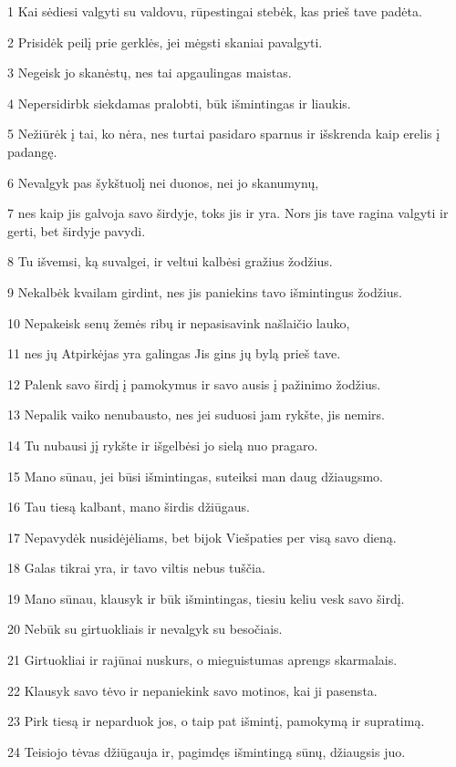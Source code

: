 \par 1 Kai sėdiesi valgyti su valdovu, rūpestingai stebėk, kas prieš tave padėta. 
\par 2 Prisidėk peilį prie gerklės, jei mėgsti skaniai pavalgyti. 
\par 3 Negeisk jo skanėstų, nes tai apgaulingas maistas. 
\par 4 Nepersidirbk siekdamas pralobti, būk išmintingas ir liaukis. 
\par 5 Nežiūrėk į tai, ko nėra, nes turtai pasidaro sparnus ir išskrenda kaip erelis į padangę. 
\par 6 Nevalgyk pas šykštuolį nei duonos, nei jo skanumynų, 
\par 7 nes kaip jis galvoja savo širdyje, toks jis ir yra. Nors jis tave ragina valgyti ir gerti, bet širdyje pavydi. 
\par 8 Tu išvemsi, ką suvalgei, ir veltui kalbėsi gražius žodžius. 
\par 9 Nekalbėk kvailam girdint, nes jis paniekins tavo išmintingus žodžius. 
\par 10 Nepakeisk senų žemės ribų ir nepasisavink našlaičio lauko, 
\par 11 nes jų Atpirkėjas yra galingas­ Jis gins jų bylą prieš tave. 
\par 12 Palenk savo širdį į pamokymus ir savo ausis į pažinimo žodžius. 
\par 13 Nepalik vaiko nenubausto, nes jei suduosi jam rykšte, jis nemirs. 
\par 14 Tu nubausi jį rykšte ir išgelbėsi jo sielą nuo pragaro. 
\par 15 Mano sūnau, jei būsi išmintingas, suteiksi man daug džiaugsmo. 
\par 16 Tau tiesą kalbant, mano širdis džiūgaus. 
\par 17 Nepavydėk nusidėjėliams, bet bijok Viešpaties per visą savo dieną. 
\par 18 Galas tikrai yra, ir tavo viltis nebus tuščia. 
\par 19 Mano sūnau, klausyk ir būk išmintingas, tiesiu keliu vesk savo širdį. 
\par 20 Nebūk su girtuokliais ir nevalgyk su besočiais. 
\par 21 Girtuokliai ir rajūnai nuskurs, o mieguistumas aprengs skarmalais. 
\par 22 Klausyk savo tėvo ir nepaniekink savo motinos, kai ji pasensta. 
\par 23 Pirk tiesą ir neparduok jos, o taip pat išmintį, pamokymą ir supratimą. 
\par 24 Teisiojo tėvas džiūgauja ir, pagimdęs išmintingą sūnų, džiaugsis juo. 
